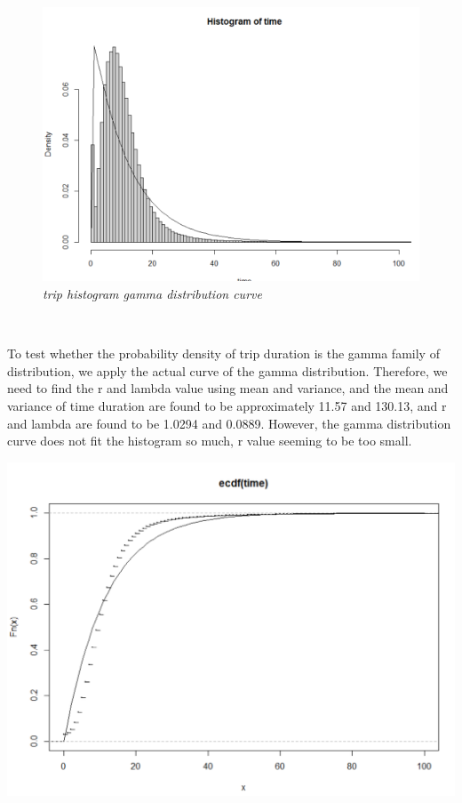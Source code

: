 \documentclass[11pt]{article}
\begin{document}
\begin{figure} \centering
    \includegraphics[scale = .5]{hist_p1_1.png}
    \caption{\textit{trip histogram gamma distribution curve}}
\end{figure}


\\
\par
To test whether the probability density of trip duration is the gamma family of distribution, we apply the actual
 curve of the gamma distribution. Therefore, we need to find the r and lambda value using mean and variance, and
 the mean and variance of time duration are found to be approximately 11.57 and 130.13, and r and lambda are found
 to be 1.0294 and 0.0889. However, the gamma distribution curve does not fit the histogram so much,  r value seeming
 to be too small. 


\includegraphics[scale = .50]{cdf_p1_1.png}
\end{document}
